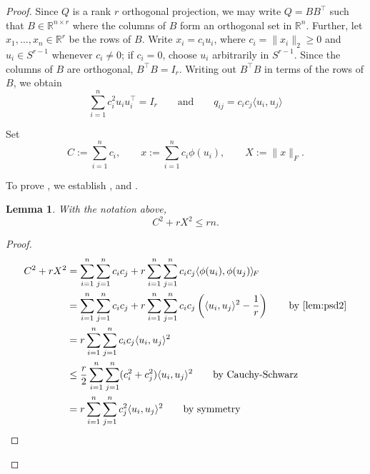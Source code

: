 \documentclass[10pt,a4paper]{amsart}
\newtheorem{lemma}{Lemma}
\newcommand{\R}{\mathbb{R}}
\newcommand{\froinner}[2]{\langle #1,#2\rangle_{\!F}}
\newcommand{\inner}[2]{\langle #1,#2\rangle}
\newcommand{\norm}[1]{\lVert #1\rVert}
\DeclareMathOperator{\tr}{tr}
\begin{document}
\begin{proof}
Since $Q$ is a rank $r$ orthogonal projection, we may write $Q = BB^\top$ such that $B \in \R^{n\times r}$ where the columns of $B$ form an orthogonal set in $\R^n$. Further, let $x_1,\ldots,x_n \in \R^r$ be the rows of $B$. Write $x_i=c_i u_i$, where $c_i=\norm{x_i}_2\ge 0$ and $u_i\in S^{r-1}$ whenever $c_i\ne 0$; if $c_i=0$, choose $u_i$ arbitrarily in $S^{r-1}$. Since the columns of $B$ are orthogonal, $B^\top B = I_r$. Writing out $B^\top B$ in terms of the rows of $B$, we obtain
\begin{equation}\label{eq:projection-model}
\sum_{i=1}^n c_i^2 u_i u_i^\top=I_r 
\qquad\text{and}\qquad
q_{ij}=c_i c_j\inner{u_i}{u_j}
\end{equation}




Set
\[
C:=\sum_{i=1}^n c_i,
\qquad
x:=\sum_{i=1}^n c_i\phi(u_i),
\qquad
X:=\norm{x}_F.
\]

To prove , we establish ,  and .

\begin{lemma}\label{lem:CS-ineq}
With the notation above,
\[
C^2+rX^2\le rn.
\]
\end{lemma}

\begin{proof}
\begin{align*}
C^2 + rX^2
&= \sum_{i=1}^n \sum_{j=1}^n c_i c_j + r \sum_{i=1}^n \sum_{j=1}^n c_i c_j \froinner{\phi(u_i)}{\phi(u_j)}\\
&= \sum_{i=1}^n \sum_{j=1}^n c_i c_j + r \sum_{i=1}^n \sum_{j=1}^n c_i c_j \left(\inner{u_i}{u_j}^2 - \frac{1}{r}\right) \text{\qquad by \Cref{lem:psd2}}\\
&= r \sum_{i=1}^n \sum_{j=1}^n c_i c_j \inner{u_i}{u_j}^2\\
&\leq \frac{r}{2}\sum_{i=1}^n \sum_{j=1}^n (c_i^2 + c_j^2) \inner{u_i}{u_j}^2 \text{\qquad by Cauchy-Schwarz}\\
&= r \sum_{i=1}^n \sum_{j=1}^n c_j^2 \inner{u_i}{u_j}^2 \text{\qquad by symmetry}
\end{align*}


\end{proof}
\end{proof}
\end{document}
